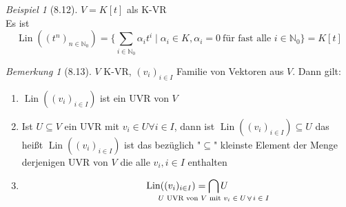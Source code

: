 \documentclass[a4paper]{scrartcl}
\DeclareMathOperator{\Forall}{\forall}
\DeclareMathOperator{\Lin}{Lin}
\theoremstyle{definition}
\theoremstyle{plain}
\theoremstyle{plain}
\theoremstyle{remark}
\newtheorem{remark}{Bemerkung}
\theoremstyle{remark}
\theoremstyle{remark}
\theoremstyle{remark}
\theoremstyle{remark}
\newtheorem{ex}{Beispiel}
\begin{document}
\begin{ex}[8.12]
$V = K[t]$ als K-VR \\
  Es ist \[\Lin((t^n)_{n\in\mathbb{N}_0}) = \{\sum_{i\in\mathbb{N}_0} \alpha_i t^i \mid \alpha_i \in K, \alpha_i = 0~\text{für fast alle $i\in \mathbb{N}_0$}\} = K[t]\]
\end{ex}
\begin{remark}[8.13]
$V$ K-VR, $(v_i)_{i\in I}$ Familie von Vektoren aus $V$. Dann gilt:
\begin{enumerate}
\item $\Lin((v_i)_{i\in I})$ ist ein UVR von $V$
\item Ist $U\subseteq V$ ein UVR mit $v_i \in U\Forall i\in I$, dann ist $\Lin((v_i)_{i\in I}) \subseteq U$
     das heißt $\Lin((v_i)_{i\in I})$ ist das bezüglich "$\subseteq$" kleinste Element der Menge derjenigen UVR von $V$ die alle $v_i, i\in I$ enthalten
\item \[\Lin((v_i)_{i\in I}) = \bigcap_{\mathclap{\text{$U$ UVR von $V$ mit $v_i \in U \Forall i\in I$}}} U\]
\end{enumerate}
\end{remark}
\end{document}
